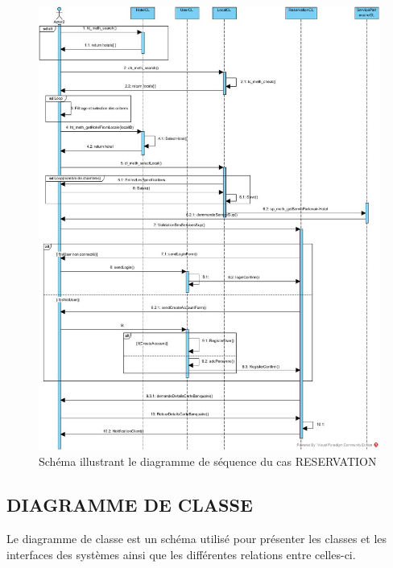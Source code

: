 \begin{figure}[h]
	\begin{center}
		\includegraphics[scale=0.4]{images/Diagramme_de_sequence.jpg}
		\caption{Schéma illustrant le diagramme de séquence du cas RESERVATION}
		\label{synthese-cout-salariev}
	\end{center}
\end{figure}

\cleardoublepage
\subsection{DIAGRAMME DE CLASSE}
Le diagramme de classe est un schéma utilisé pour présenter les classes et les interfaces des systèmes ainsi que les différentes relations entre celles-ci.

